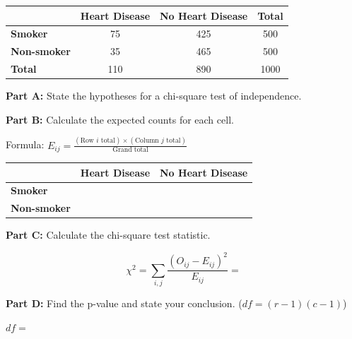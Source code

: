 \documentclass[11pt]{article}
\begin{document}
\begin{center}
\begin{tabular}{l|cc|c}
& \textbf{Heart Disease} & \textbf{No Heart Disease} & \textbf{Total} \\
\hline
\textbf{Smoker} & 75 & 425 & 500 \\
\textbf{Non-smoker} & 35 & 465 & 500 \\
\hline
\textbf{Total} & 110 & 890 & 1000 \\
\end{tabular}
\end{center}

\vspace{6pt}

\textbf{Part A:} State the hypotheses for a chi-square test of independence.

\vspace{2.5cm}

\textbf{Part B:} Calculate the expected counts for each cell.

\vspace{0.3cm}

Formula: $E_{ij} = \frac{(\text{Row } i \text{ total}) \times (\text{Column } j \text{ total})}{\text{Grand total}}$

\vspace{0.3cm}

\begin{tabular}{l|cc}
& \textbf{Heart Disease} & \textbf{No Heart Disease} \\
\hline
\textbf{Smoker} & & \\[1cm]
\textbf{Non-smoker} & & \\[1cm]
\end{tabular}

\vspace{1.5cm}

\textbf{Part C:} Calculate the chi-square test statistic.

\vspace{0.3cm}

$$\chi^2 = \sum_{i,j} \frac{(O_{ij} - E_{ij})^2}{E_{ij}} = $$

\vspace{3.5cm}

\textbf{Part D:} Find the p-value and state your conclusion. ($df = (r-1)(c-1)$)

\vspace{0.3cm}

$df = $

\vspace{0.5cm}
\end{document}
